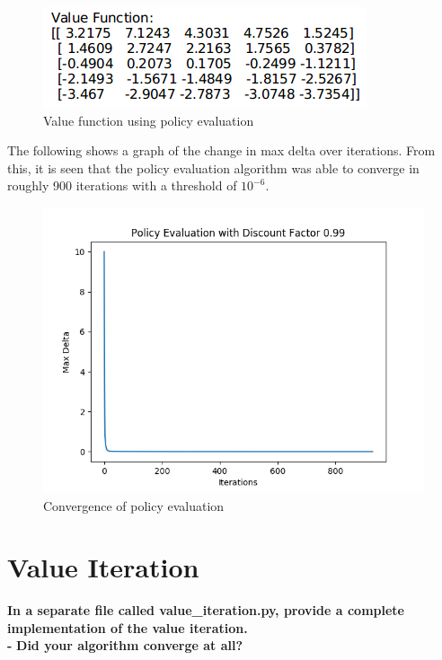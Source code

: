 \documentclass[11pt]{article}
\begin{document}
\begin{figure}[h]
\includegraphics[scale=0.6]{v_evaluation}
\centering
\caption{Value function using policy evaluation}
\end{figure}

\noindent
The following shows a graph of the change in max delta over iterations. From
this, it is seen that the policy evaluation algorithm was able to converge in
roughly 900 iterations with a threshold of $10^{-6}$. \\

\begin{figure}[h]
\includegraphics[scale=0.7]{policy_evaluation_99}
\centering
\caption{Convergence of policy evaluation}
\end{figure}


\newpage
\section{Value Iteration}
\textbf{In a separate file called value\_iteration.py, provide a complete
implementation of the value iteration.}
\\

\noindent
\textbf{-}
\noindent
\textbf{Did your algorithm converge at all?}
\\
\end{document}
